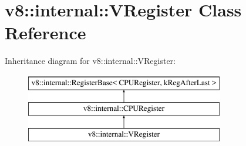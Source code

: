 \hypertarget{classv8_1_1internal_1_1VRegister}{}\section{v8\+:\+:internal\+:\+:V\+Register Class Reference}
\label{classv8_1_1internal_1_1VRegister}
Inheritance diagram for v8\+:\+:internal\+:\+:V\+Register\+:\begin{figure}[H]
\begin{center}
\leavevmode
\includegraphics[height=3.000000cm]{classv8_1_1internal_1_1VRegister}
\end{center}
\end{figure}
